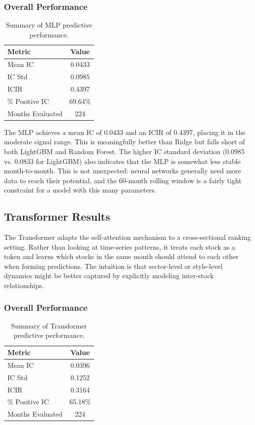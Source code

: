 \documentclass[11pt]{article}
\begin{document}
\subsubsection{Overall Performance}

\begin{table}[H]
\centering
\begin{tabular}{lc}
\toprule
\textbf{Metric} & \textbf{Value} \\
\midrule
Mean IC & 0.0433 \\
IC Std & 0.0985 \\
ICIR & 0.4397 \\
\% Positive IC & 69.64\% \\
Months Evaluated & 224 \\
\bottomrule
\end{tabular}
\caption{Summary of MLP predictive performance.}
\label{tab:mlp_results}
\end{table}

The MLP achieves a mean IC of 0.0433 and an ICIR of 0.4397, placing it in the moderate signal range. This is meaningfully better than Ridge but falls short of both LightGBM and Random Forest. The higher IC standard deviation (0.0985 vs. 0.0833 for LightGBM) also indicates that the MLP is somewhat less stable month-to-month. This is not unexpected: neural networks generally need more data to reach their potential, and the 60-month rolling window is a fairly tight constraint for a model with this many parameters.

\subsection{Transformer Results}

The Transformer adapts the self-attention mechanism to a cross-sectional ranking setting. Rather than looking at time-series patterns, it treats each stock as a token and learns which stocks in the same month should attend to each other when forming predictions. The intuition is that sector-level or style-level dynamics might be better captured by explicitly modeling inter-stock relationships.

\subsubsection{Overall Performance}

\begin{table}[H]
\centering
\begin{tabular}{lc}
\toprule
\textbf{Metric} & \textbf{Value} \\
\midrule
Mean IC & 0.0396 \\
IC Std & 0.1252 \\
ICIR & 0.3164 \\
\% Positive IC & 65.18\% \\
Months Evaluated & 224 \\
\bottomrule
\end{tabular}
\caption{Summary of Transformer predictive performance.}
\label{tab:transformer_results}
\end{table}
\end{document}
